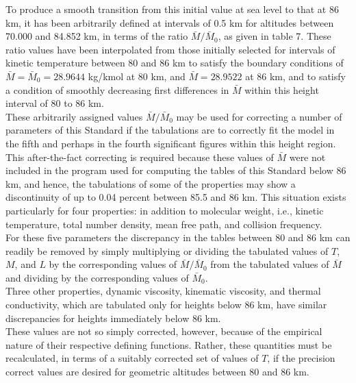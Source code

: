 \documentclass{article}
\begin{document}
To produce a smooth transition from this initial value at sea level to that at 86 km, it has been arbitrarily defined at intervals of 0.5 km for altitudes between 70.000 and 84.852 km, in terms of the ratio \(\bar{M} / \bar{M}_0\), as given in table 7. These ratio values have been interpolated from those initially selected for intervals of kinetic temperature between 80 and 86 km to satisfy the boundary conditions of \(\bar{M} = \bar{M}_0 = 28.9644\) kg/kmol at 80 km, and \(\bar{M} = 28.9522\) at 86 km, and to satisfy a condition of smoothly decreasing first differences in \(\bar{M}\) within this height interval of 80 to 86 km.\\

These arbitrarily assigned values \(\bar{M} / \bar{M}_0\) may be used for correcting a number of parameters of this Standard if the tabulations are to correctly fit the model in the fifth and perhaps in the fourth significant figures within this height region.\\

This after-the-fact correcting is required because these values of \(\bar{M}\) were not included in the program used for computing the tables of this Standard below 86 km, and hence, the tabulations of some of the properties may show a discontinuity of up to 0.04 percent between 85.5 and 86 km. This situation exists particularly for four properties: in addition to molecular weight, i.e., kinetic temperature, total number density, mean free path, and collision frequency.\\

For these five parameters the discrepancy in the tables between 80 and 86 km can readily be removed by simply multiplying or dividing the tabulated values of \(T\), \(M\), and \(L\) by the corresponding values of \(\bar{M} / \bar{M}_0\) from the tabulated values of \(\bar{M}\) and dividing by the corresponding values of \(\bar{M}_0\).\\

Three other properties, dynamic viscosity, kinematic viscosity, and thermal conductivity, which are tabulated only for heights below 86 km, have similar discrepancies for heights immediately below 86 km.\\

These values are not so simply corrected, however, because of the empirical nature of their respective defining functions. Rather, these quantities must be recalculated, in terms of a suitably corrected set of values of \(T\), if the precision correct values are desired for geometric altitudes between 80 and 86 km.\\
\end{document}
